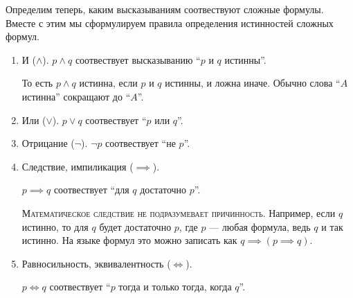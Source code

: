 Определим теперь, каким высказываниям соотвествуют сложные формулы.
Вместе с этим мы сформулируем правила определения истинностей сложных формул.
\begin{enumerate}
  \item{}И ($\land$).
  $p\land q$ соотвествует высказыванию ``$p$ и $q$ истинны''.

  То есть $p\land q$ истинна, если $p$ и $q$ истинны,
  и ложна иначе. Обычно слова ``$A$ истинна'' сокращают до ``$A$''.

  \item{}Или ($\lor$).
  $p\lor q$ соотвествует ``$p$ или $q$''.

  \item{}Отрицание ($\lnot$).
  $\lnot p$ соотвествует ``не $p$''.

  \item{}Следствие,
  импиликация ($\implies$).

  ${p\implies q}$ соотвествует ``для $q$ достаточно $p$''.

  \textsc{Математическое следствие не подразумевает
    причинность}. Например, если $q$ истинно,
  то для $q$ будет достаточно $p$, где $p$ --- любая формула,
  ведь $q$ и так истинно.
  На языке формул это можно записать как $q\implies (p\implies q)$.

  \item{}Равносильность,
  эквивалентность ($\iff$).

  $p\iff q$ соотвествует ``$p$ тогда и только тогда, когда $q$''.
\end{enumerate}

